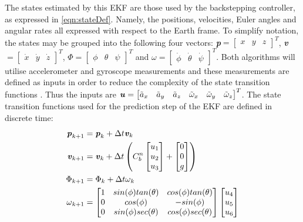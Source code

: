 The states estimated by this EKF are those used by the backstepping controller, as expressed in \eqref{eqn:stateDef}. Namely, the positions, velocities, Euler angles and angular rates all expressed with respect to the Earth frame. To simplify notation, the states may be grouped into the following four vectors: \textbf{\textit{p}}$=\begin{bmatrix}x& y& z\end{bmatrix}^{T}$, \textbf{\textit{v}}$=\begin{bmatrix}\dot{x}& \dot{y}& \dot{z}\end{bmatrix}^{T}$, \textbf{\textit{$\Phi$}}$=\begin{bmatrix}\phi& \theta& \psi\end{bmatrix}^{T}$ and \textbf{\textit{$\omega$}}$=\begin{bmatrix}\dot{\phi}& \dot{\theta}& \dot{\psi}\end{bmatrix}^{T}$. Both algorithms will utilise accelerometer and gyroscope measurements and these measurements are defined as inputs in order to reduce the complexity of the state transition functions \cite{Driessen2018}. Thus the inputs are $\textbf{\textit{u}}=
\begin{bmatrix}
\tilde{a}_{x}&\tilde{a}_{y}&\tilde{a}_{z}&\tilde{\omega}_{x}&\tilde{\omega}_{y}&\tilde{\omega}_{z}
\end{bmatrix}^{T}
$. The state transition functions used for the prediction step of the EKF are defined in discrete time:
\begin{equation}\label{eqn:OFS_EKFStateTrans}
\begin{split}
\textbf{\textit{p}}_{k+1}&=\textbf{\textit{p}}_{k}+\Delta t\textbf{\textit{v}}_{k} \\
\textbf{\textit{v}}_{k+1}&=\textbf{\textit{v}}_{k}+\Delta t\left( C^{n}_{b}
\begin{bmatrix}
u_{1}\\
u_{2}\\
u_{3}
\end{bmatrix}
+
\begin{bmatrix}
0\\
0\\
g
\end{bmatrix}
\right)\\
\textbf{\textit{$\Phi$}}_{k+1}&=\textbf{\textit{$\Phi$}}_{k}+\Delta t\textbf{\textit{$\omega$}}_{k}\\
\textbf{\textit{$\omega$}}_{k+1}&=
\begin{bmatrix}
1& sin(\phi)tan(\theta)& cos(\phi)tan(\theta)\\
0 &cos(\phi) &-sin(\phi)\\
0 &sin(\phi)sec(\theta) &cos(\phi)sec(\theta)
\end{bmatrix}
\begin{bmatrix}
u_{4}\\
u_{5}\\
u_{6}
\end{bmatrix}
\end{split}
\end{equation}
 

